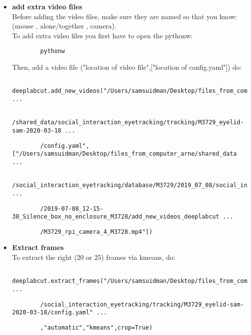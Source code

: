 \documentclass{article}
\begin{document}
\begin{itemize}
    \item \textbf{add extra video files} \\
    Before adding the video files, make sure they are named so that you know: (mouse , alone/together , camera). \\
    To add extra video files you first have to open the pythonw:
    \begin{verbatim}
        pythonw
    \end{verbatim}
    Then, add a video file ("location of video file",["location of config.yaml"]) do:
    \begin{verbatim}
        deeplabcut.add_new_videos("/Users/samsuidman/Desktop/files_from_computer_arne ...
    \end{verbatim}
    \begin{verbatim}
        /shared_data/social_interaction_eyetracking/tracking/M3729_eyelid-sam-2020-03-18 ...
    \end{verbatim}
    \begin{verbatim}
        /config.yaml",["/Users/samsuidman/Desktop/files_from_computer_arne/shared_data ...
    \end{verbatim}
    \begin{verbatim}
        /social_interaction_eyetracking/database/M3729/2019_07_08/social_interaction ...
    \end{verbatim}
    \begin{verbatim}
        /2019-07-08_12-15-38_Silence_box_no_enclosure_M3728/add_new_videos_deeplabcut ...
    \end{verbatim}
    \begin{verbatim}
        /M3729_rpi_camera_4_M3728.mp4"])
    \end{verbatim}
    
    \item \textbf{Extract frames} \\
    To extract the right (20 or 25) frames via kmeans, do:
    \begin{verbatim}
        deeplabcut.extract_frames("/Users/samsuidman/Desktop/files_from_computer_arne/shared_data ...
    \end{verbatim}
    \begin{verbatim}
        /social_interaction_eyetracking/tracking/M3729_eyelid-sam-2020-03-18/config.yaml" ...
    \end{verbatim}
    \begin{verbatim}
        ,"automatic","kmeans",crop=True)
    \end{verbatim}
    

\end{itemize}
\end{document}
